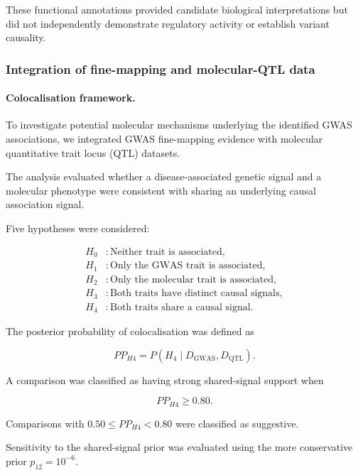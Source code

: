 \documentclass[11pt,a4paper]{article}
\begin{document}
These functional annotations provided candidate biological
interpretations but did not independently demonstrate
regulatory activity or establish variant causality.


\subsubsection{Integration of fine-mapping and molecular-QTL data}
\label{subsec:coloc_methodology}

\paragraph{Colocalisation framework.}

To investigate potential molecular mechanisms underlying
the identified GWAS associations, we integrated GWAS
fine-mapping evidence with molecular quantitative trait
locus (QTL) datasets.

The analysis evaluated whether a disease-associated
genetic signal and a molecular phenotype were consistent
with sharing an underlying causal association signal.

Five hypotheses were considered:

\begin{align}
H_0 &: \text{Neither trait is associated}, \\
H_1 &: \text{Only the GWAS trait is associated}, \\
H_2 &: \text{Only the molecular trait is associated}, \\
H_3 &: \text{Both traits have distinct causal signals}, \\
H_4 &: \text{Both traits share a causal signal}.
\end{align}

The posterior probability of colocalisation was defined as

\begin{equation}
PP_{H4}
=
P(H_4 \mid D_{\mathrm{GWAS}},D_{\mathrm{QTL}}).
\label{eq:coloc_h4}
\end{equation}

A comparison was classified as having strong
shared-signal support when

\begin{equation}
PP_{H4} \geq 0.80.
\end{equation}

Comparisons with
$0.50 \leq PP_{H4} < 0.80$
were classified as suggestive.

Sensitivity to the shared-signal prior was evaluated
using the more conservative prior
$p_{12}=10^{-6}$.
\end{document}
